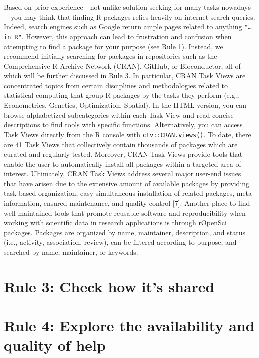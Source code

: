 \documentclass[10pt,letterpaper]{article}
\begin{document}
Based on prior experience---not unlike solution-seeking for many tasks
nowadays---you may think that finding R packages relies heavily on
internet search queries. Indeed, search engines such as Google return
ample pages related to anything \texttt{"\ldots{}in\ R"}. However, this
approach can lead to frustration and confusion when attempting to find a
package for your purpose (see Rule 1). Instead, we recommend initially
searching for packages in repositories such as the Comprehensive R
Archive Network (CRAN), GitHub, or Bioconductor, all of which will be
further discussed in Rule 3. In particular,
\href{https://cran.r-project.org/web/views/}{CRAN Task Views} are
concentrated topics from certain disciplines and methodologies related
to statistical computing that group R packages by the tasks they perform
(e.g., Econometrics, Genetics, Optimization, Spatial). In the HTML
version, you can browse alphabetized subcategories within each Task View
and read concise descriptions to find tools with specific functions.
Alternatively, you can access Task Views directly from the R console
with \texttt{ctv::CRAN.views()}. To date, there are 41 Task Views that
collectively contain thousands of packages which are curated and
regularly tested. Moreover, CRAN Task Views provide tools that enable
the user to automatically install all packages within a targeted area of
interest. Ultimately, CRAN Task Views address several major user-end
issues that have arisen due to the extensive amount of available
packages by providing task-based organization, easy simultaneous
installation of related packages, meta-information, ensured maintenance,
and quality control {[}7{]}. Another place to find well-maintained tools
that promote reusable software and reproducibility when working with
scientific data in research applications is through
\href{https://ropensci.org/packages/}{rOpenSci packages}. Packages are
organized by name, maintainer, description, and status (i.e., activity,
association, review), can be filtered according to purpose, and searched
by name, maintainer, or keywords.

\hypertarget{rule-3-check-how-its-shared}{%
\section{Rule 3: Check how it's
shared}\label{rule-3-check-how-its-shared}}

\hypertarget{rule-4-explore-the-availability-and-quality-of-help}{%
\section{Rule 4: Explore the availability and quality of
help}\label{rule-4-explore-the-availability-and-quality-of-help}}
\end{document}
